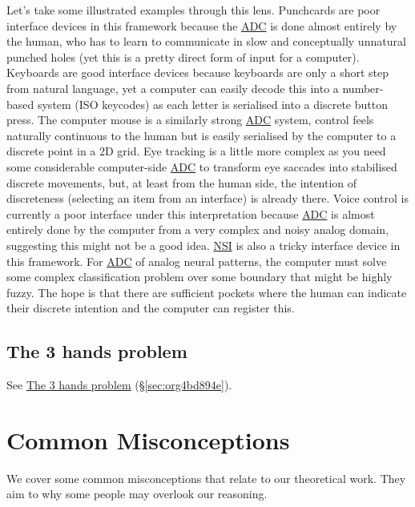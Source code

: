 \documentclass[logo,bsc,singlespacing,parskip]{infthesis}
\begin{document}
Let's take some illustrated examples through this lens.
Punchcards are poor interface devices in this framework because the \hyperref[org44fccbb]{ADC} is done almost entirely by the human, who has to learn to communicate in slow and conceptually unnatural punched holes (yet this is a pretty direct form of input for a computer).
Keyboards are good interface devices because keyboards are only a short step from natural language, yet a computer can easily decode this into a number-based system (ISO keycodes) as each letter is serialised into a discrete button press.
The computer mouse is a similarly strong \hyperref[org44fccbb]{ADC} system, control feels naturally continuous to the human but is easily serialised by the computer to a discrete point in a 2D grid.
Eye tracking is a little more complex as you need some considerable computer-side \hyperref[org44fccbb]{ADC} to transform eye saccades into stabilised discrete movements, but, at least from the human side, the intention of discreteness (selecting an item from an interface) is already there.
Voice control is currently a poor interface under this interpretation because \hyperref[org44fccbb]{ADC} is almost entirely done by the computer from a very complex and noisy analog domain, suggesting this might not be a good idea.
\hyperref[orgf403bf3]{NSI} is also a tricky interface device in this framework.
For \hyperref[org44fccbb]{ADC} of analog neural patterns, the computer must solve some complex classification problem over some boundary that might be highly fuzzy.
The hope is that there are sufficient pockets where the human can indicate their discrete intention and the computer can register this.

\section{The 3 hands problem}
\label{sec:org6ab8aab}

See \hyperref[sec:org4bd894e]{The 3 hands problem} (\S \ref{sec:org4bd894e}).
\chapter{Common Misconceptions}
\label{sec:org650adbc}
We cover some common misconceptions that relate to our theoretical work.
They aim to why some people may overlook our reasoning.
\end{document}
